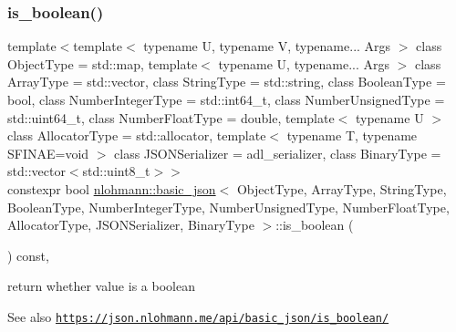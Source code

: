 \subsubsection{\texorpdfstring{is\+\_\+boolean()}{is\_boolean()}}
{\footnotesize\ttfamily template$<$template$<$ typename U, typename V, typename... Args $>$ class Object\+Type = std\+::map, template$<$ typename U, typename... Args $>$ class Array\+Type = std\+::vector, class String\+Type  = std\+::string, class Boolean\+Type  = bool, class Number\+Integer\+Type  = std\+::int64\+\_\+t, class Number\+Unsigned\+Type  = std\+::uint64\+\_\+t, class Number\+Float\+Type  = double, template$<$ typename U $>$ class Allocator\+Type = std\+::allocator, template$<$ typename T, typename S\+F\+I\+N\+A\+E=void $>$ class J\+S\+O\+N\+Serializer = adl\+\_\+serializer, class Binary\+Type  = std\+::vector$<$std\+::uint8\+\_\+t$>$$>$ \\
constexpr bool \hyperlink{classnlohmann_1_1basic__json}{nlohmann\+::basic\+\_\+json}$<$ Object\+Type, Array\+Type, String\+Type, Boolean\+Type, Number\+Integer\+Type, Number\+Unsigned\+Type, Number\+Float\+Type, Allocator\+Type, J\+S\+O\+N\+Serializer, Binary\+Type $>$\+::is\+\_\+boolean (\begin{DoxyParamCaption}{ }\end{DoxyParamCaption}) const\hspace{0.3cm}{\ttfamily [inline]}, {\ttfamily [noexcept]}}



return whether value is a boolean 

\begin{DoxySeeAlso}{See also}
\href{https://json.nlohmann.me/api/basic_json/is_boolean/}{\tt https\+://json.\+nlohmann.\+me/api/basic\+\_\+json/is\+\_\+boolean/} 
\end{DoxySeeAlso}
\mbox{\label{classnlohmann_1_1basic__json_aecaaa0613d3f3a5b49b34b02afc5f85d}} 
